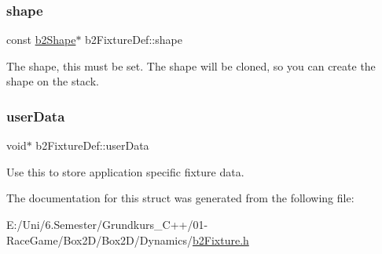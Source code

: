 \mbox{\label{structb2_fixture_def_a1e41753d89abf3443e7897e2498a3240}} 
\subsubsection{\texorpdfstring{shape}{shape}}
{\footnotesize\ttfamily const \mbox{\hyperlink{classb2_shape}{b2\+Shape}}$\ast$ b2\+Fixture\+Def\+::shape}

The shape, this must be set. The shape will be cloned, so you can create the shape on the stack. \mbox{\label{structb2_fixture_def_a4f77ef2b2585a40899b61faf53db1093}} 
\subsubsection{\texorpdfstring{userData}{userData}}
{\footnotesize\ttfamily void$\ast$ b2\+Fixture\+Def\+::user\+Data}



Use this to store application specific fixture data. 



The documentation for this struct was generated from the following file\+:\begin{DoxyCompactItemize}
\item 
E\+:/\+Uni/6.\+Semester/\+Grundkurs\+\_\+\+C++/01-\/\+Race\+Game/\+Box2\+D/\+Box2\+D/\+Dynamics/\mbox{\hyperlink{b2_fixture_8h}{b2\+Fixture.\+h}}\end{DoxyCompactItemize}
